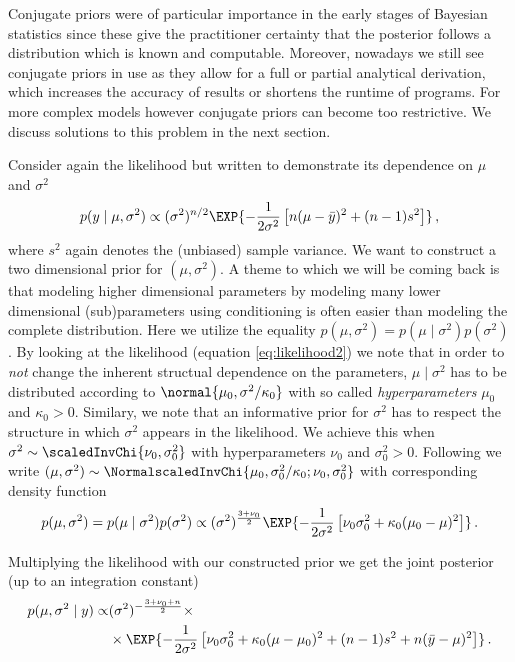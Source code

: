 Conjugate priors were of particular importance in the early stages of Bayesian statistics since these give the practitioner certainty that the posterior follows a distribution which is known and computable. Moreover, nowadays we still see conjugate priors in use as they allow for a full or partial analytical derivation, which increases the accuracy of results or shortens the runtime of programs. For more complex models however conjugate priors can become too restrictive. We discuss solutions to this problem in the next section.

Consider again the likelihood but written to demonstrate its dependence on $\mu$ and $\sigma^2$
\begin{align}
  p(y \mid \mu, \sigma^2) \propto (\sigma^2)^{n/2} \EXP{-\frac{1}{2\sigma^2} \left[ n(\mu - \bar{y})^2 + (n-1)s^2 \right]} \,,
  \label{eq:likelihood2}
\end{align}
where $s^2$ again denotes the (unbiased) sample variance.
We want to construct a two dimensional prior for $(\mu, \sigma^2)$.
A theme to which we will be coming back is that modeling higher dimensional parameters by modeling many lower dimensional (sub)parameters using conditioning is often easier than modeling the complete distribution.
Here we utilize the equality $p(\mu, \sigma^2) = p(\mu \mid \sigma^2) p(\sigma^2)$.
By looking at the likelihood (equation \ref{eq:likelihood2}) we note that in order to \emph{not} change the inherent structual dependence on the parameters, $\mu \mid \sigma^2$ has to be distributed according to $\normal{\mu_0, \sigma^2 / \kappa_0}$ with so called \emph{hyperparameters} $\mu_0$ and $\kappa_0 > 0$.
Similary, we note that an informative prior for $\sigma^2$ has to respect the structure in which $\sigma^2$ appears in the likelihood.
We achieve this when $\sigma^2 \sim \scaledInvChi{\nu_0, \sigma_0^2}$ with hyperparameters $\nu_0$ and $\sigma_0^2 > 0$.
Following \citet{gelmanbda04} we write $(\mu, \sigma^2) \sim \NormalscaledInvChi{\mu_0, \sigma_0^2 / \kappa_0; \nu_0, \sigma_0^2}$ with corresponding density function
\begin{align}
  p(\mu, \sigma^2) = p(\mu \mid \sigma^2) p(\sigma^2) \propto (\sigma^2)^{\frac{3 + \nu_0}{2}} \EXP{-\frac{1}{2\sigma^2} \left[\nu_0 \sigma_0^2 + \kappa_0(\mu_0 - \mu)^2 \right]} \,.
\end{align}

Multiplying the likelihood with our constructed prior we get the joint posterior (up to an integration constant)
\begin{align}
  \begin{split}
  p(\mu, \sigma^2 \mid y) \propto& (\sigma^2)^{-\frac{3 + \nu_0 + n}{2}} \times\\
  & \times \EXP{-\frac{1}{2 \sigma^2} \left[\nu_0\sigma_0^2 + \kappa_0(\mu - \mu_0)^2 + (n-1)s^2 + n(\bar{y} - \mu)^2 \right]} \,.
  \end{split}
  \label{eq:conjugate_posterior}
\end{align}

